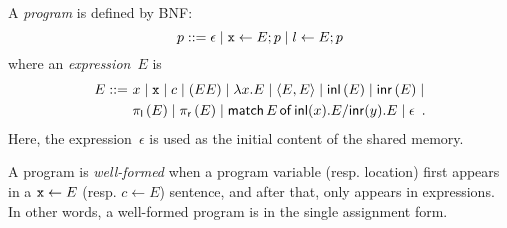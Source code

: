 A \textit{program} is defined by BNF:
\[
 p ::= \epsilon\mid
 \texttt{x}\leftarrow E; p \mid
 l \leftarrow E; p
\]
where an \textit{expression}~$E$ is
\begin{align*}
 E
 ::=\,\,
 &x\mid \texttt{x} \mid c \mid (EE)\mid \lambda
 x.E\mid \langle{E,E}\rangle\mid \mathsf{inl}\left({E}\right)\mid \mathsf{inr}\left({E}\right)\mid \\
 &\pi_{\mathsf l}\left({E}\right)\mid\pi_{\mathsf r}\left({E}\right)\mid  \mathsf{match}\,{E}\,\mathsf{of}\, \mathsf{inl}({x}). {E}/ \mathsf{inr}({y}). {E}\mid \epsilon\enspace.
\end{align*}
Here, the expression~$\epsilon$ is used as the initial content of the shared
memory.

\newcommand{\Wg}{W_{\mathrm g}}
\newcommand{\Wd}{W_{\mathrm d}}
A program is \textit{well-formed} when
a program variable (resp. location) first appears in a $\texttt{x}\leftarrow E$
(resp. $c\leftarrow E$)
sentence, and
after that, only appears in expressions.
In other words, a well-formed program is in the single assignment form.

